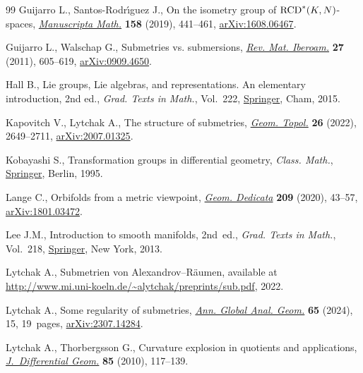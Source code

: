 \documentclass[pdftex]{sigma}
\numberwithin{equation}{section}
\theoremstyle{definition}
\begin{document}
\begin{thebibliography}{99}
Guijarro L., Santos-Rodr\'{\i}guez J., On the isometry group of {${\rm
 RCD}^*(K,N)$}-spaces,
 \href{https://doi.org/10.1007/s00229-018-1010-7}{\textit{Manuscripta Math.}}
 \textbf{158} (2019), 441--461,
 \href{http://arxiv.org/abs/1608.06467}{arXiv:1608.06467}.

Guijarro L., Walschap G., Submetries vs. submersions,
 \href{https://doi.org/10.4171/RMI/648}{\textit{Rev. Mat. Iberoam.}}
 \textbf{27} (2011), 605--619,
 \href{http://arxiv.org/abs/0909.4650}{arXiv:0909.4650}.

Hall B., Lie groups, {L}ie algebras, and representations. An elementary
 introduction, 2nd ed., \textit{Grad. Texts in Math.}, Vol.~222,
 \href{https://doi.org/10.1007/978-3-319-13467-3}{Springer}, Cham, 2015.

Kapovitch V., Lytchak A., The structure of submetries,
 \href{https://doi.org/10.2140/gt.2022.26.2649}{\textit{Geom. Topol.}}
 \textbf{26} (2022), 2649--2711,
 \href{http://arxiv.org/abs/2007.01325}{arXiv:2007.01325}.

Kobayashi S., Transformation groups in differential geometry, \textit{Class. Math.},
 \href{https://doi.org/10.1007/978-3-642-61981-6}{Springer}, Berlin, 1995.

Lange C., Orbifolds from a metric viewpoint,
 \href{https://doi.org/10.1007/s10711-020-00521-x}{\textit{Geom. Dedicata}}
 \textbf{209} (2020), 43--57,
 \href{http://arxiv.org/abs/1801.03472}{arXiv:1801.03472}.

Lee J.M., Introduction to smooth manifolds, 2nd~ed., \textit{Grad. Texts in Math.}, Vol.~218, \href{https://doi.org/10.1007/978-1-4419-9982-5}{Springer}, New
 York, 2013.

Lytchak A., Submetrien von {A}lexandrov--{R}\"aumen, available at
 \url{http://www.mi.uni-koeln.de/~alytchak/preprints/sub.pdf}, 2022.

Lytchak A., Some regularity of submetries,
 \href{https://doi.org/10.1007/s10455-024-09946-z}{\textit{Ann. Global Anal.
 Geom.}} \textbf{65} (2024), 15, 19~pages,
 \href{http://arxiv.org/abs/2307.14284}{arXiv:2307.14284}.

Lytchak A., Thorbergsson G., Curvature explosion in quotients and applications,
 \href{https://doi.org/10.4310/jdg/1284557927}{\textit{J.~Differential Geom.}}
 \textbf{85} (2010), 117--139.


\end{thebibliography}
\end{document}

